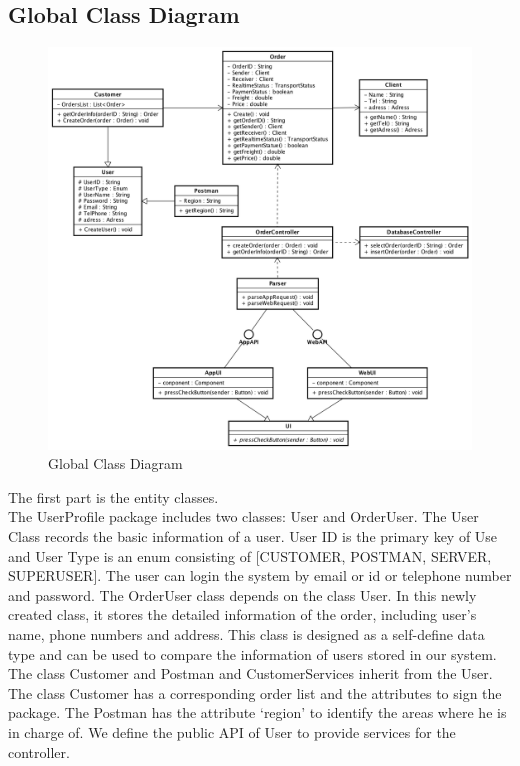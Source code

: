 \documentclass[12pt]{scrreprt}
\begin{document}
\subsection{Global Class Diagram}
\begin{figure}[H]
  \centering\includegraphics[width=6in]{DocumentRes/ClassDiagram.png}
  \caption{Global Class Diagram}
\end{figure}
The first part is the entity classes.\\
The UserProfile package includes two classes: User and OrderUser. The User Class records the basic information of a user. User ID is the primary key of Use and User Type is an enum consisting of [CUSTOMER, POSTMAN, SERVER, SUPERUSER]. The user can login the system by email or id or telephone number and password. The OrderUser class depends on the class User. In this newly created class, it stores the detailed information of the order, including user’s name, phone numbers and address. This class is designed as a self-define data type and can be used to compare the information of users stored in our system.
The class Customer and Postman and CustomerServices inherit from the User.\\
The class Customer has a corresponding order list and the attributes to sign the package. The Postman has the attribute ‘region’ to identify the areas where he is in charge of. We define the public API of User to provide services for the controller.
\end{document}
